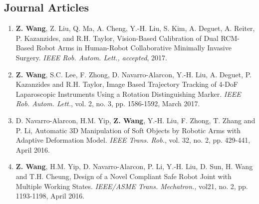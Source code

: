 \documentclass[10pt,letterpaper]{article}
\begin{document}
    \subsection*{Journal Articles}
    \begin{enumerate}
        \item \textbf{Z. Wang}, Z. Liu, Q. Ma, A. Cheng, Y.-H. Liu, S. Kim, A. Deguet, A. Reiter, P. Kazanzides, and R.H. Taylor,
        Vision-Based Calibration of Dual RCM-Based Robot Arms in Human-Robot Collaborative Minimally Invasive Surgery.
        \textit{IEEE Rob. Autom. Lett., accepted}, 2017.
        \item \textbf{Z. Wang}, S.C. Lee, F. Zhong, D. Navarro-Alarcon, Y.-H. Liu, A. Deguet, P. Kazanzides and R.H. Taylor,
        Image Based Trajectory Tracking of 4-DoF Laparoscopic Instruments Using a Rotation Distinguishing Marker.
        \textit{IEEE Rob. Autom. Lett.}, vol. 2, no. 3, pp. 1586-1592, March 2017.
        \item D. Navarro-Alarcon, H.M. Yip, \textbf{Z. Wang}, Y.-H. Liu, F. Zhong, T. Zhang and P. Li,
        Automatic 3D Manipulation of Soft Objects by Robotic Arms with Adaptive Deformation Model.
        \textit{{IEEE} Trans. Rob.}, vol. 32, no. 2, pp. 429-441, April 2016.
        \item \textbf{Z. Wang}, H.M. Yip, D. Navarro-Alarcon, P. Li, Y.-H. Liu, D. Sun, H. Wang and T.H. Cheung,
        Design of a Novel Compliant Safe Robot Joint with Multiple Working States.
        \textit{{IEEE/ASME} Trans. Mechatron.}, vol21, no. 2, pp. 1193-1198, April 2016.
    \end{enumerate}
\end{document}
